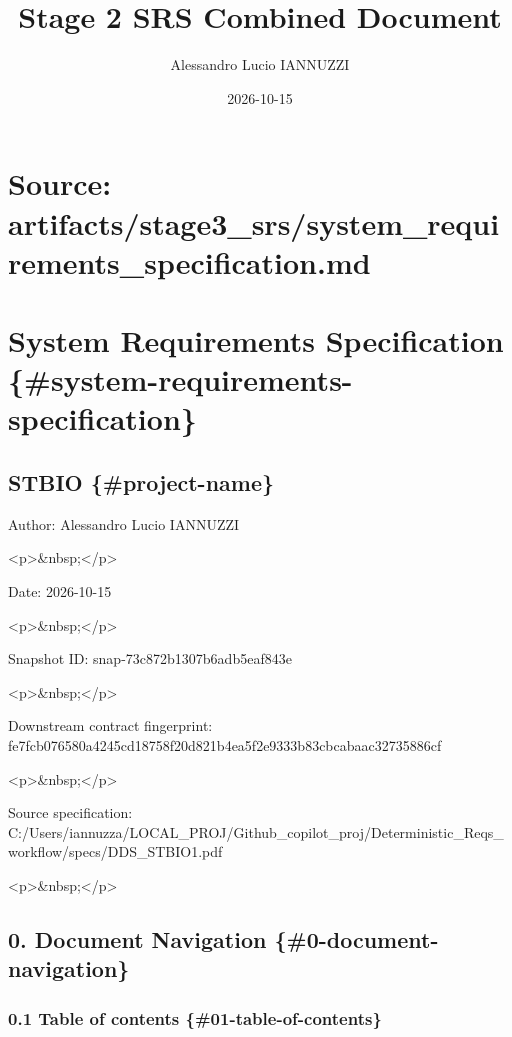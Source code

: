 \documentclass[11pt]{article}
\title{Stage 2 SRS Combined Document}
\author{Alessandro Lucio IANNUZZI}
\date{2026-10-15}
\begin{document}
\thispagestyle{empty}
\null
\newpage
\tableofcontents
\newpage

\section*{Source: artifacts/stage3\_srs/system\_requirements\_specification.md}

\section{System Requirements Specification \{\#system-requirements-specification\}}


\subsection{STBIO \{\#project-name\}}


Author: Alessandro Lucio IANNUZZI

<p>\&nbsp;</p>

Date: 2026-10-15

<p>\&nbsp;</p>

Snapshot ID: snap-73c872b1307b6adb5eaf843e

<p>\&nbsp;</p>

Downstream contract fingerprint: fe7fcb076580a4245cd18758f20d821b4ea5f2e9333b83cbcabaac32735886cf

<p>\&nbsp;</p>

Source specification: C:/Users/iannuzza/LOCAL\_PROJ/Github\_copilot\_proj/Deterministic\_Reqs\_workflow/specs/DDS\_STBIO1.pdf

<p>\&nbsp;</p>

\subsection{0. Document Navigation \{\#0-document-navigation\}}


\subsubsection{0.1 Table of contents \{\#01-table-of-contents\}}
\end{document}
